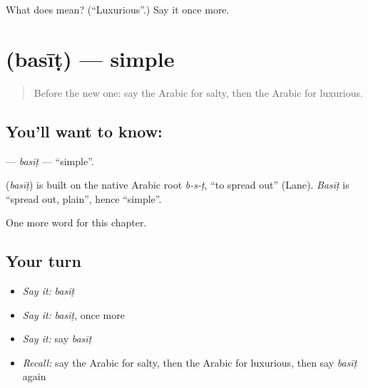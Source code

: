 \begin{tcolorbox}[breakable,colback=teal!4,colframe=teal!35!black,title={Before you move on}]
What does  mean? (\textquotedblleft{}Luxurious\textquotedblright{}.) Say it once more.
\end{tcolorbox}
\section[\texorpdfstring{\ar{بسيط} (basīṭ)}{بسيط (basīṭ)}]{ (basīṭ) — simple}

\label{lesson:AR-C145-basit}



\begin{quote}
Before the new one: say the Arabic for salty, then the Arabic for luxurious.
\end{quote}

\subsection*{You'll want to know: }
\textbf{} — \emph{basīṭ} — \textquotedblleft{}simple\textquotedblright{}.

\begin{cousinweb}
\textbf{} (\emph{basīṭ}) is built on the native Arabic root \emph{b-s-ṭ}, \textquotedblleft{}to spread out\textquotedblright{} (Lane). \emph{Basīṭ} is \textquotedblleft{}spread out, plain\textquotedblright{}, hence \textquotedblleft{}simple\textquotedblright{}.
\end{cousinweb}

\begin{grammarlens}[title={What you've built}]
One more word for this chapter.
\end{grammarlens}

\subsection*{Your turn}
\begin{itemize}
\raggedright
  \item \emph{Say it:} \emph{basīṭ}
  \item \emph{Say it:} \emph{basīṭ}, once more
  \item \emph{Say it:} say \emph{basīṭ}
  \item \emph{Recall:} say the Arabic for salty, then the Arabic for luxurious, then say \emph{basīṭ} again
\end{itemize}

